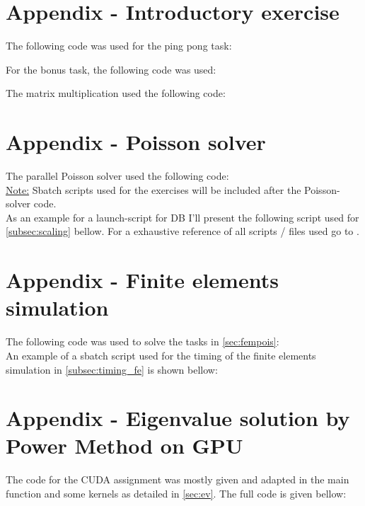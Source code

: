 
\section*{Appendix - Introductory exercise}
\label{app:pingpong}
The following code was used for the ping pong task:

For the bonus task, the following code was used:


\label{app:mm}
The matrix multiplication used the following code: 


\newpage
\section*{Appendix - Poisson solver}
\label{app:poisson}
The parallel Poisson solver used the following code:\\
\underline{Note:} Sbatch scripts used for the exercises will be included after the Poisson-solver code.\\

As an example for a launch-script for DB I'll present the following script used for \autoref{subsec:scaling} bellow. 
For a exhaustive reference of all scripts / files used go to .


\newpage
\section*{Appendix - Finite elements simulation}
The following code was used to solve the tasks in \autoref{sec:fempois}:\\

An example of a sbatch script used for the timing of the finite elements simulation in \autoref{subsec:timing_fe} is shown bellow: 


\newpage
\section*{Appendix - Eigenvalue solution by Power Method on GPU}
The code for the CUDA assignment was mostly given and adapted in the main function and some kernels as detailed in \autoref{sec:ev}. The full code is given bellow: 
